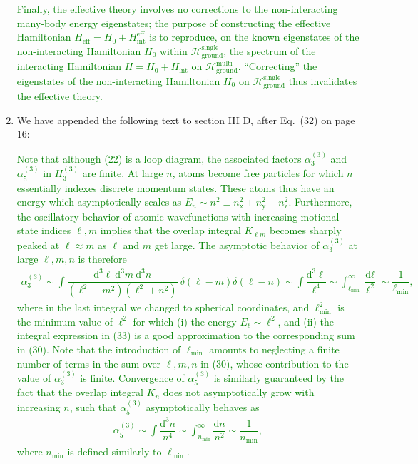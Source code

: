 \documentclass[preprint,showkeys,nofootinbib]{revtex4-1}
\renewcommand{\t}{\text} %
\newcommand{\f}{\dfrac} %
\newcommand{\p}[1]{\left(#1\right)} %
\renewcommand{\d}{\text{d}}
\newcommand{\x}{\text{x}}
\newcommand{\y}{\text{y}}
\newcommand{\z}{\text{z}}
\renewcommand{\H}{\mathcal{H}}
\newcommand{\1}{\mathds{1}}
\newcommand{\green}[1]{\textcolor{green}{#1}}
\newcounter{point}
\newcommand{\step}{\stepcounter{point}\setcounter{enumi}{0}}
\begin{document}
\begin{enumerate}[label=(R1.\arabic{point}.\arabic*)]
  \green{Finally, the effective theory involves no corrections to the
    non-interacting many-body energy eigenstates; the purpose of
    constructing the effective Hamiltonian
    $H_{\t{eff}} = H_0 + H_{\t{int}}^{\t{eff}}$ is to reproduce, on
    the known eigenstates of the non-interacting Hamiltonian $H_0$
    within $\H_{\t{ground}}^{\t{single}}$, the spectrum of the
    interacting Hamiltonian $H = H_0 + H_{\t{int}}$ on
    $\H_{\t{ground}}^{\t{multi}}$.  ``Correcting'' the eigenstates of
    the non-interacting Hamiltonian $H_0$ on
    $\H_{\t{ground}}^{\t{single}}$ thus invalidates the effective
    theory.}


  \step
  \step
\item We have appended the following text to section III D, after
  Eq.~(32) on page 16:

  \green{Note that although (22) is a loop diagram, the associated
    factors $\alpha_3^{(3)}$ and $\alpha_5^{(3)}$ in $H_3^{(3)}$ are
    finite.  At large $n$, atoms become free particles for which $n$
    essentially indexes discrete momentum states.  These atoms thus
    have an energy which asymptotically scales as
    $E_n\sim n^2\equiv n_\x^2+n_\y^2+n_\z^2$.  Furthermore, the
    oscillatory behavior of atomic wavefunctions with increasing
    motional state indices $\ell,m$ implies that the overlap integral
    $K_{\ell m}$ becomes sharply peaked at $\ell\approx m$ as $\ell$
    and $m$ get large.  The asymptotic behavior of $\alpha_3^{(3)}$ at
    large $\ell,m,n$ is therefore
    \begin{align*}
      \alpha_3^{(3)}
      \sim \int \f{\d^3\ell~\d^3m~\d^3n}{\p{\ell^2+m^2}\p{\ell^2+n^2}}
      ~\delta\p{\ell-m}\delta\p{\ell-n}
      \sim \int \f{\d^3\ell}{\ell^4}
      \sim \int_{\ell_{\t{min}}}^\infty \f{\d\ell}{\ell^2}
      \sim \f1{\ell_{\t{min}}},
      \tag{33}
    \end{align*}
    where in the last integral we changed to spherical coordinates,
    and $\ell_{\t{min}}^2$ is the minimum value of $\ell^2$ for which
    (i) the energy $E_\ell\sim\ell^2$, and (ii) the integral
    expression in (33) is a good approximation to the corresponding
    sum in (30).  Note that the introduction of $\ell_{\t{min}}$
    amounts to neglecting a finite number of terms in the sum over
    $\ell,m,n$ in (30), whose contribution to the value of
    $\alpha_3^{(3)}$ is finite.  Convergence of $\alpha_5^{(3)}$ is
    similarly guaranteed by the fact that the overlap integral $K_n$
    does not asymptotically grow with increasing $n$, such that
    $\alpha_5^{(3)}$ asymptotically behaves as
    \begin{align*}
      \alpha_5^{(3)} \sim \int \f{\d^3 n}{n^4}
      \sim \int_{n_{\t{min}}}^\infty \f{\d n}{n^2}
      \sim \f1{n_{\t{min}}},
      \tag{34}
    \end{align*}
    where $n_{\t{min}}$ is defined similarly to $\ell_{\t{min}}$.}



\end{enumerate}
\end{document}

